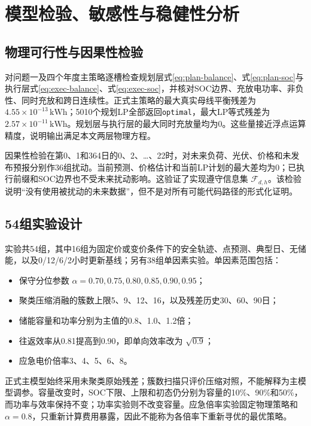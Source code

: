 \section{模型检验、敏感性与稳健性分析}

\subsection{物理可行性与因果性检验}

对问题一及四个年度主策略逐槽检查规划层式\eqref{eq:plan-balance}、式\eqref{eq:plan-soc}与执行层式\eqref{eq:exec-balance}、式\eqref{eq:exec-soc}，并核对SOC边界、充放电功率、非负性、同时充放和跨日连续性。正式主策略的最大真实母线平衡残差为 $4.55\times10^{-13}\,\mathrm{kWh}$；5010个规划LP全部返回\texttt{optimal}，最大LP等式残差为 $2.57\times10^{-11}\,\mathrm{kWh}$。规划层与执行层的最大同时充放量均为0。这些量接近浮点运算精度，说明输出满足本文两层物理方程。

因果性检验在第0、1和364日的0、2、\ldots、22时，对未来负荷、光伏、价格和未发布预报分别作36组扰动。当前预测、价格估计和当前LP计划的最大差均为0；已执行前缀和SOC边界也不受未来扰动影响。这验证了实现遵守信息集 $\mathcal F_{d,h}$。该检验说明“没有使用被扰动的未来数据”，但不是对所有可能代码路径的形式化证明。

\subsection{54组实验设计}

实验共54组，其中16组为固定价或变价条件下的安全轨迹、点预测、典型日、无储能，以及0/12/6/2小时更新基线；另有38组单因素实验。单因素范围包括：
\begin{itemize}
  \item 保守分位参数 $\alpha=0.70,0.75,0.80,0.85,0.90,0.95$；
  \item 聚类压缩消融的簇数上限5、9、12、16，以及残差历史30、60、90日；
  \item 储能容量和功率分别为主值的0.8、1.0、1.2倍；
  \item 往返效率从0.81提高到0.90，即单向效率改为 $\sqrt{0.9}$；
  \item 应急电价倍率3、4、5、6、8。
\end{itemize}
正式主模型始终采用未聚类原始残差；簇数扫描只评价压缩对照，不能解释为主模型调参。容量改变时，SOC下限、上限和初态仍分别为容量的10\%、90\%和50\%，而功率与效率保持不变；功率实验则不改变容量。应急倍率实验固定物理策略和 $\alpha=0.8$，只重新计算费用暴露，因此不能称为各倍率下重新寻优的最优策略。

